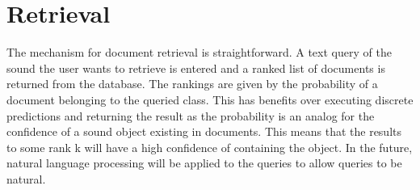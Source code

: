 \section{Retrieval}
The mechanism for document retrieval is straightforward. A text query of the sound the user wants to retrieve is entered and a ranked list of documents is returned from the database. The rankings are given by the probability of a document belonging to the queried class. This has benefits over executing discrete predictions and returning the result as the probability is an analog for the confidence of a sound object existing in documents. This means that the results to some rank k will have a high confidence of containing the object. In the future, natural language processing will be applied to the queries to allow queries to be natural.
